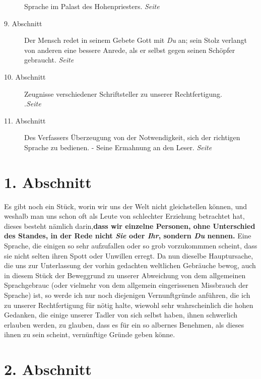 \begin{description}
Sprache im Palast des Hohenpriesters.
\dotfill \textit{Seite~\pageref{kap10_ab8}}\\
\item[9. Abschnitt] Der Mensch redet in seinem Gebete Gott mit \textit{Du} an;
sein
Stolz verlangt von anderen eine bessere Anrede, als er selbst gegen seinen
Schöpfer gebraucht.
\dotfill \textit{Seite~\pageref{kap10_ab9}}\\
\item[10. Abschnitt] Zeugnisse verschiedener Schriftsteller zu unserer
Rechtfertigung.\\
.\dotfill \textit{Seite~\pageref{kap10_ab10}}\\
\item[11. Abschnitt] Des Verfassers Überzeugung von der Notwendigkeit, sich
der richtigen Sprache zu bedienen. - Seine Ermahnung an den Leser.
\dotfill \textit{Seite~\pageref{kap10_ab11}}

\end{description}

\newpage

\section{1. Abschnitt} \label{kap10_ab1}

Es gibt noch ein Stück, worin wir uns der Welt nicht
gleichstellen können, und
weshalb man uns schon oft als Leute von schlechter Erziehung betrachtet hat,
dieses besteht nämlich darin,\textbf{dass wir einzelne
Personen, ohne Unterschied des
Standes, in der Rede nicht \textit{Sie} oder \textit{Ihr}, sondern \textit{Du}
nennen.} Eine
Sprache, die einigen so sehr aufzufallen oder so grob vorzukommmen scheint, dass
sie nicht selten ihren Spott oder Unwillen erregt. Da nun dieselbe Hauptursache,
die uns zur Unterlassung der vorhin gedachten weltlichen Gebräuche bewog, auch
in diesem Stück der Beweggrund zu unserer Abweichung von dem allgemeinen
Sprachgebrauc (oder vielmehr von dem allgemein eingerissenen Missbrauch der
Sprache) ist, so werde ich nur noch diejenigen Vernunftgründe anführen, die ich
zu unserer Rechtfertigung für nötig halte, wiewohl sehr wahrscheinlich die
hohen Gedanken, die einige unserer Tadler von sich selbst haben, ihnen
schwerlich erlauben werden, zu glauben, dass es für ein so albernes Benehmen,
als
dieses ihnen zu sein scheint, vernünftige Gründe geben könne.

\section{2. Abschnitt} \label{kap10_ab2}

